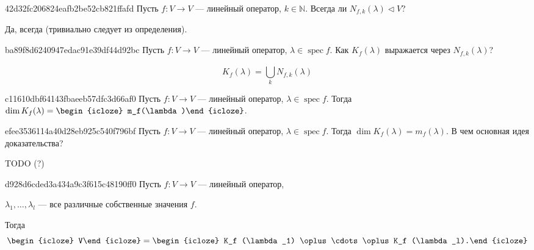 \begin{note}{42d32fc206824eafb2be52cb821ffafd}
    Пусть \( f : V \to V \) --- линейный оператор, \( k \in \mathbb N \).
    Всегда ли \( N_{f,k}(\lambda) \triangleleft V \)?

    \begin{cloze}{1}
        Да, всегда (тривиально следует из определения).
    \end{cloze}
\end{note}

\begin{note}{ba89f8d6240947edac91e39df44d92bc}
    Пусть \( f : V \to V \) --- линейный оператор, \( \lambda \in \operatorname{spec} f \).
    Как \( K_f(\lambda) \) выражается через \( N_{f,k} (\lambda) \)?

    \begin{cloze}{1}
        \[
            K_f(\lambda) = \bigcup_{k}^{} N_{f,k}(\lambda)
        \]
    \end{cloze}
\end{note}

\begin{note}{c11610dbf64143fbaeeb57dfc3d66af0}
    Пусть \( f : V \to V \) --- линейный оператор, \( \lambda \in \operatorname{spec} f \).
    Тогда \( \dim K_f(\lambda) = \begin{icloze}{1}m_f(\lambda)\end{icloze} \).
\end{note}

\begin{note}{efee3536114a40d28eb925c540f796bf}
    Пусть \( f : V \to V \) --- линейный оператор, \( \lambda \in \operatorname{spec} f \).
    Тогда \( \dim K_f(\lambda) = m_f(\lambda) \).
    В чем основная идея доказательства?

    \begin{cloze}{1}
        TODO (?)
    \end{cloze}
\end{note}

\begin{note}{d928d6cded3a434a9c3f615c48190ff0}
    Пусть \( f : V \to V \) --- линейный оператор, \begin{icloze}{3}\( \lambda_1, \ldots, \lambda_l \) --- все различные собственные значения \( f \).\end{icloze}
    Тогда
    \[
        \begin{icloze}{2}V\end{icloze} = \begin{icloze}{1}K_f (\lambda_1) \oplus \cdots \oplus K_f (\lambda_l).\end{icloze}
    \]
\end{note}

